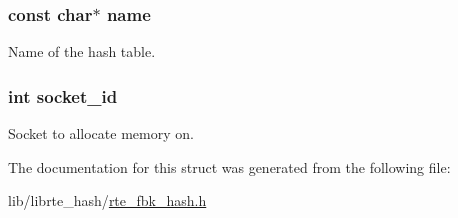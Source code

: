\subsubsection[{name}]{\setlength{\rightskip}{0pt plus 5cm}const char$\ast$ name}\label{structrte__fbk__hash__params_a8f8f80d37794cde9472343e4487ba3eb}
Name of the hash table. \hypertarget{structrte__fbk__hash__params_a229cb0bd24215f0cb940e0724dbd4d55}{}
\subsubsection[{socket\+\_\+id}]{\setlength{\rightskip}{0pt plus 5cm}int socket\+\_\+id}\label{structrte__fbk__hash__params_a229cb0bd24215f0cb940e0724dbd4d55}
Socket to allocate memory on. 

The documentation for this struct was generated from the following file\+:\begin{DoxyCompactItemize}
\item 
lib/librte\+\_\+hash/\hyperlink{rte__fbk__hash_8h}{rte\+\_\+fbk\+\_\+hash.\+h}\end{DoxyCompactItemize}
